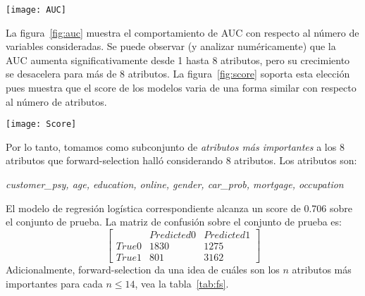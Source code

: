 \documentclass[letterpaper,11pt]{article}
\newenvironment{Figure}
  {\par\medskip\noindent\minipage{\linewidth}}
  {\endminipage\par\medskip}
\begin{document}
\begin{multicols}{2}
\begin{Figure}
    \centering
    \texttt{[image: AUC]}
    \label{fig:auc}
\end{Figure}
La figura~\ref{fig:auc} muestra el comportamiento de AUC con respecto al número de variables consideradas. Se puede
observar (y analizar numéricamente) que la AUC aumenta significativamente desde 1 hasta 8 atributos, pero su crecimiento
se desacelera para más de 8 atributos. La figura~\ref{fig:score} soporta esta elección pues muestra que el score de los modelos varia de una
forma similar con respecto al número de atributos.
\begin{Figure}
    \texttt{[image: Score]}
\label{fig:score}
\end{Figure}
 Por lo tanto, tomamos como subconjunto de \emph{atributos más
importantes} a los 8 atributos que forward-selection halló considerando 8 atributos. Los atributos son:
\begin{center} \em customer\_psy, age, education, online, gender, 
car\_prob, mortgage, occupation
\end{center}
El modelo de regresión logística correspondiente alcanza un score de 0.706 sobre el conjunto de prueba. La matriz de
confusión sobre
el conjunto de prueba es:
\[\begin{bmatrix}
        & Predicted 0 & Predicted  1 \\
   True 0 & 1830 & 1275\\
   True 1 & 801 &3162
 \end{bmatrix}\]
 Adicionalmente, forward-selection da una idea de cuáles son los $n$ atributos más importantes para cada
$n\leq 14$, vea la tabla~\ref{tab:fs}. 


\end{multicols}
\end{document}

